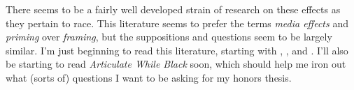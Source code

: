 \documentclass[doc,12pt]{apa6}
\begin{document}
There seems to be a fairly well developed strain of research on these effects
as they pertain to race. This literature seems to prefer the terms \emph{media
effects} and \emph{priming} over \emph{framing}, but the suppositions and
questions seem to be largely similar. I'm just beginning to read this
literature, starting with ,
, and . I'll also be starting to read
\emph{Articulate While Black} \cite{Alim12} soon, which should help me iron
out what (sorts of) questions I want to be asking for my honors thesis.

\clearpage



\end{document}
